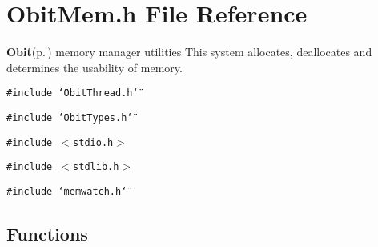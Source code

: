 \section{Obit\-Mem.h File Reference}
\label{ObitMem_8h}
{\bf Obit}{\rm (p.\,\pageref{structObit})} memory manager utilities This system allocates, deallocates and determines the usability of memory. 

{\tt \#include \char`\"{}Obit\-Thread.h\char`\"{}}\par
{\tt \#include \char`\"{}Obit\-Types.h\char`\"{}}\par
{\tt \#include $<$stdio.h$>$}\par
{\tt \#include $<$stdlib.h$>$}\par
{\tt \#include \char`\"{}memwatch.h\char`\"{}}\par
\subsection*{Functions}
